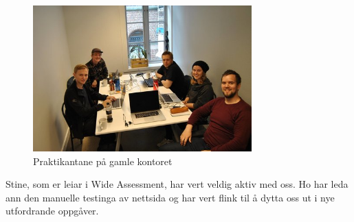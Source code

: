 \documentclass[12pt]{article}
\begin{document}
\begin{figure}[h]
  \includegraphics[width=0.75\textwidth]{Studenter}
  \centering
  \caption{Praktikantane på gamle kontoret}
  \label{fig:praktikantar1}
\end{figure}

Stine, som er leiar i Wide Assessment, har vert veldig aktiv med oss. Ho har leda
ann den manuelle testinga av nettsida og har vert flink til å dytta oss ut i nye
utfordrande oppgåver.
\end{document}
